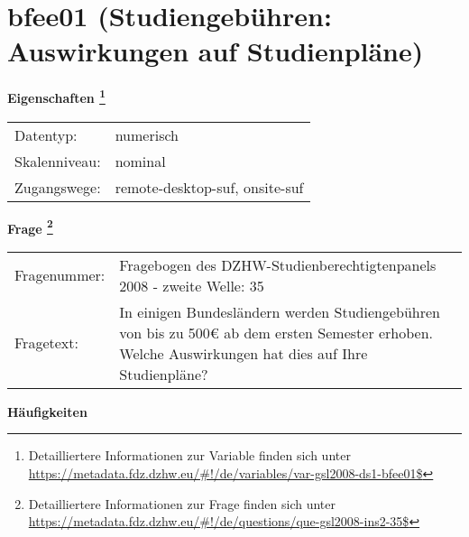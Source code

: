 
    \setcounter{footnote}{0}

    \vspace*{-1.8cm}
	\section{bfee01 (Studiengebühren: Auswirkungen auf Studienpläne)}
	\label{section:bfee01}



    \vspace*{0.5cm}
    \noindent\textbf{Eigenschaften
	\footnote{Detailliertere Informationen zur Variable finden sich unter
		\url{https://metadata.fdz.dzhw.eu/\#!/de/variables/var-gsl2008-ds1-bfee01$}}}\\
	\begin{tabularx}{\hsize}{@{}lX}
	Datentyp: & numerisch \\
	Skalenniveau: & nominal \\
	Zugangswege: &
	  remote-desktop-suf, 
	  onsite-suf
 \\
    \end{tabularx}



				\vspace*{0.5cm}
                \noindent\textbf{Frage
	                \footnote{Detailliertere Informationen zur Frage finden sich unter
		              \url{https://metadata.fdz.dzhw.eu/\#!/de/questions/que-gsl2008-ins2-35$}}}\\
				\begin{tabularx}{\hsize}{@{}lX}
					Fragenummer: &
					  Fragebogen des DZHW-Studienberechtigtenpanels 2008 - zweite Welle:
					  35
 \\
					Fragetext: & In einigen Bundesländern werden Studiengebühren von bis zu 500€ ab dem ersten Semester erhoben. Welche Auswirkungen hat dies auf Ihre Studienpläne? \\
				\end{tabularx}





        		\vspace*{0.5cm}
                \noindent\textbf{Häufigkeiten}

